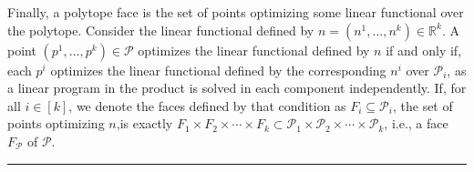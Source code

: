 \documentclass[twoside]{article}
\newcommand{\R}{\mathbb{R}}
\newcommand{\jmlrBlackBox}{\rule{1.5ex}{1.5ex}}
\newcommand{\jmlrQED}{\hfill\jmlrBlackBox\par\bigskip}
\providecommand{\proofname}{Proof}
\renewenvironment{proof}{\par\noindent{\bfseries\upshape \proofname\ }}{\jmlrQED}
\newcommand{\mP}{\mathcal{P}}
\newcommand{\mQ}{\mathcal{Q}}
\newcommand{\verts}[1]{\mathcal{V}_{#1}}
\begin{document}
\begin{proof}
Finally, a polytope face is the set of points optimizing some linear functional over the polytope.
Consider the linear functional defined by $n = (n^1, \ldots, n^k) \in \R^k$.
A point $(p^1, \ldots, p^k) \in \mP$ optimizes the linear functional defined by $n$ if and only if, each $p^i$ optimizes the linear functional defined by the corresponding $n^i$ over $\mP_i$, as a linear program in the product is solved in each component independently. 
If, for all $i \in [k]$, we denote the faces defined by that condition as $F_i \subseteq \mP_i$, the set of points optimizing $n$,is exactly $F_1 \times F_2 \times \cdots \times F_k \subset \mP_1 \times \mP_2 \times \cdots \times \mP_k$, i.e., a face $F_\mP$ of $\mP$.
\end{proof}
\end{document}
